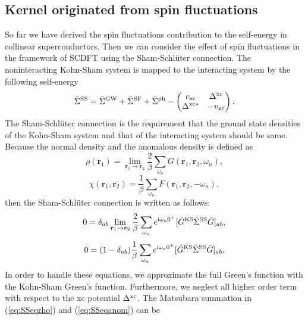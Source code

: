 \subsection{Kernel originated from spin fluctuations}
So far we have derived the spin fluctuations contribution to the self-energy in collinear superconductors.
Then we can consider the effect of spin fluctuations in the framework of SCDFT using the Sham-Schl\"{u}ter connection\cite{Sham1983,MarquesphD}.
The noninteracting Kohn-Sham system is mapped to the interacting system by the following self-energy
%
\begin{equation}
	\bar{\Sigma}^{\rm SS} = \bar{\Sigma}^{\rm GW} + \bar{\Sigma}^{\rm SF} + \bar{\Sigma}^{\rm ph}
	- 
	\begin{pmatrix}
		v_{\rm xc}  &   \Delta^{\rm xc}   \\
		\Delta^{\rm xc\ast}  &  -v_{\rm xc}
	\end{pmatrix}.
	\label{eq:SSself-energy}
\end{equation}
The Sham-Schl\"{u}ter connection is the requirement that the ground state densities of the Kohn-Sham
system and that of the interacting system should be same.
Because the normal density and the anomalous density is defined as 
%
\begin{equation}
	\rho(\bm r_1) = \lim_{\bm r_1 \to \bm r_2}
	\frac{2}{\beta}\sum_{\omega_n}G(\bm r_1,\bm r_2,\omega_n),
	\label{eq:normaldensity}
\end{equation}
%
\begin{equation}
	\chi(\bm r_1, \bm r_2) = \frac{1}{\beta}\sum_{\omega_n}F(\bm r_1, \bm r_2, -\omega_n),
	\label{eq:anomdensity}
\end{equation}
%
then the Sham-Schl\"{u}ter connection is written as follows:
%
\begin{equation}
	0 = \delta_{ab}\lim_{\bm r_1 \to \bm r_2} \frac{2}{\beta} 
	\sum_{\omega_n}e^{\rm i\omega_n0^{+}}[\bar{G}^{\rm KS}\bar{\Sigma}^{\rm SS}\bar{G}]_{ab},
	\label{eq:SSeqrho}
\end{equation}
%
\begin{equation}
	0 = (1-\delta_{ab})\frac{1}{\beta}\sum_{\omega_n}
	e^{\rm i\omega_n0^{+}}[\bar{G}^{\rm KS}\bar{\Sigma}^{\rm SS}\bar{G}]_{ab},
	\label{eq:SSeqanom}
\end{equation}
%
In order to handle these equations, we approximate the full Green's function with the Kohn-Sham
Green's function. Furthermore, we neglect all higher order term with respect to the xc potential
$\Delta^{\rm xc}$. The Matsubara summation in (\ref{eq:SSeqrho}) and (\ref{eq:SSeqanom}) can be
